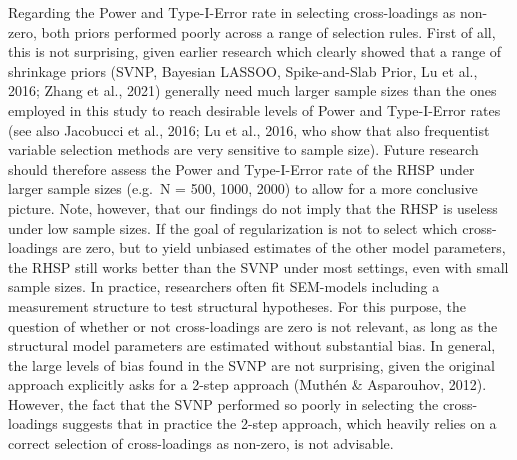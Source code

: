 \documentclass[
  man, donotrepeattitle,floatsintext]{apa6}
\begin{document}
Regarding the Power and Type-I-Error rate in selecting cross-loadings as non-zero, both priors performed poorly across a range of selection rules. First of all, this is not surprising, given earlier research which clearly showed that a range of shrinkage priors (SVNP, Bayesian LASSOO, Spike-and-Slab Prior, Lu et al., 2016; Zhang et al., 2021) generally need much larger sample sizes than the ones employed in this study to reach desirable levels of Power and Type-I-Error rates (see also Jacobucci et al., 2016; Lu et al., 2016, who show that also frequentist variable selection methods are very sensitive to sample size). Future research should therefore assess the Power and Type-I-Error rate of the RHSP under larger sample sizes (e.g.~N = 500, 1000, 2000) to allow for a more conclusive picture. Note, however, that our findings do not imply that the RHSP is useless under low sample sizes. If the goal of regularization is not to select which cross-loadings are zero, but to yield unbiased estimates of the other model parameters, the RHSP still works better than the SVNP under most settings, even with small sample sizes. In practice, researchers often fit SEM-models including a measurement structure to test structural hypotheses. For this purpose, the question of whether or not cross-loadings are zero is not relevant, as long as the structural model parameters are estimated without substantial bias. In general, the large levels of bias found in the SVNP are not surprising, given the original approach explicitly asks for a 2-step approach (Muthén \& Asparouhov, 2012). However, the fact that the SVNP performed so poorly in selecting the cross-loadings suggests that in practice the 2-step approach, which heavily relies on a correct selection of cross-loadings as non-zero, is not advisable.
\end{document}
